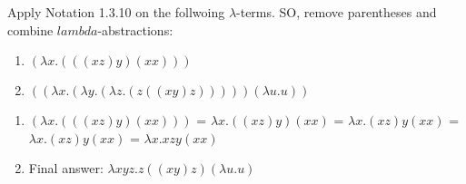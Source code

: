 \begin{problem}{1.1}
    Apply Notation 1.3.10 on the follwoing $\lambda$-terms. SO, remove parentheses and combine $lambda$-abstractions:
    \begin{enumerate}
        \item $(\lambda x.(((xz)y)(xx)))$
        \item $((\lambda x.(\lambda y.(\lambda z .(z((xy)z)))))(\lambda u.u))$
    \end{enumerate}
\end{problem}

\begin{solution}
    \begin{enumerate}
        \item $(\lambda x.(((xz)y)(xx)))$ = $\lambda x. ((xz)y)(xx)$ = $\lambda x. (xz)y(xx)$ = $\lambda x. (xz)y(xx)$ = $\lambda x. xzy(xx)$
        \item Final answer: $\lambda xyz. z((xy)z)(\lambda u.u)$
    \end{enumerate}
\end{solution}